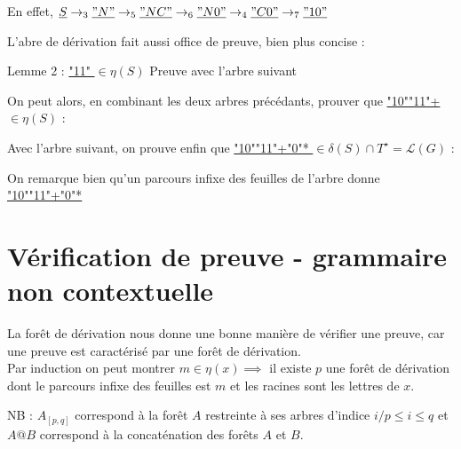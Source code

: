 \documentclass[a4paper,12pt]{article}
\begin{document}
    En effet, $\underline{ S }\rightarrow_3 \underline{ "N" } \rightarrow_5 \underline{ "NC" } \rightarrow_6 \underline{ "N0" } \rightarrow_4 \underline{ "C0" } \rightarrow_7 \underline{ "10" }$


L'abre de dérivation fait aussi office de preuve, bien plus concise :
   

Lemme 2 : \underline{ "11" } $\in \eta(S)$
Preuve avec l'arbre suivant
 

On peut alors, en combinant les deux arbres précédants, prouver que \underline{ "10""11"+ } $\in \eta(S)$ :
 

Avec l'arbre suivant, on prouve enfin que \underline{ "10""11"+"0"* } $\in \delta(S) \cap T^\star = \mathcal{L}(G)$ :
 

On remarque bien qu'un parcours infixe des feuilles de l'arbre donne \underline{ "10""11"+"0"* }

\section{Vérification de preuve - grammaire non contextuelle}

La forêt de dérivation nous donne une bonne manière de vérifier une preuve, car une preuve est caractérisé par une forêt de dérivation.\\

Par induction on peut montrer $m \in \eta(x) \implies $ il existe $p$ une forêt de dérivation dont le parcours infixe des feuilles est $m$ et les racines sont les lettres de $x$.

{\color{gray} NB : $A_{[p,q]}$ correspond à la forêt $A$ restreinte à ses arbres d'indice $i / p\leq i \leq q$ et $A@B$ correspond à la concaténation des forêts $A$ et $B$. }\\
\end{document}

